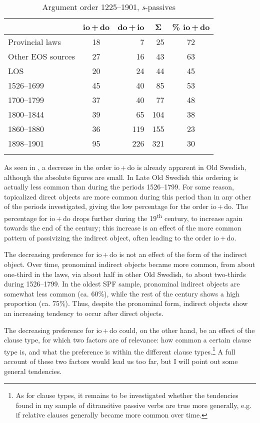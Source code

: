\documentclass[output=paper]{langscibook}
\begin{document}
\begin{table}
\caption{Argument order 1225–1901, \textit{s}{}-passives}
\label{tab:falk:4}
\begin{tabular}{lcrrc}
\lsptoprule
& \multicolumn{1}{c}{io\,+\,do} & \multicolumn{1}{c}{do\,+\,io} & \multicolumn{1}{c}{Σ} & \multicolumn{1}{c}{\% io\,+\,do}\\\midrule
Provincial laws & 18 & 7 & 25 & 72\\
Other EOS sources & 27 & 16 & 43 & 63\\
LOS & 20 & 24 & 44 & 45\\
1526–1699 & 45 & 40 & 85 & 53\\
1700–1799 & 37 & 40 & 77 & 48\\
1800–1844 & 39 & 65 & 104 & 38\\
1860–1880 & 36 & 119 & 155 & 23 \\
1898–1901 & 95 & 226 & 321 & 30\\
\lspbottomrule
\end{tabular}
\end{table}

As seen in , a decrease in the order io\,+\,do is already apparent in Old Swedish, although the absolute figures are small. In Late Old Swedish this ordering is actually less common than during the periods 1526–1799. For some reason, topicalized direct objects are more common during this period than in any other of the periods investigated, giving the low percentage for the order io\,+\,do. The percentage for io\,+\,do drops further during the 19\textsuperscript{th} century, to increase again towards the end of the century; this increase is an effect of the more common pattern of passivizing the indirect object, often leading to the order io\,+\,do.


The decreasing preference for io\,+\,do is not an effect of the form of the indirect object. Over time, pronominal indirect objects became more common, from about one-third in the laws, via about half in other Old Swedish, to about two-thirds during 1526–1799. In the oldest SPF sample, pronominal indirect objects are somewhat less common (ca. 60\%), while the rest of the century shows a high proportion (ca. 75\%). Thus, despite the pronominal form, indirect objects show an increasing tendency to occur after direct objects.



The decreasing preference for io\,+\,do could, on the other hand, be an effect of the clause type, for which two factors are of relevance: how common a certain clause type is, and what the preference is within the different clause types.\footnote{As for clause types, it remains to be investigated whether the tendencies found in my sample of ditransitive passive verbs are true more generally, e.g. if relative clauses generally became more common over time.}  A full account of these two factors would lead us too far, but I will point out some general tendencies.
\end{document}
